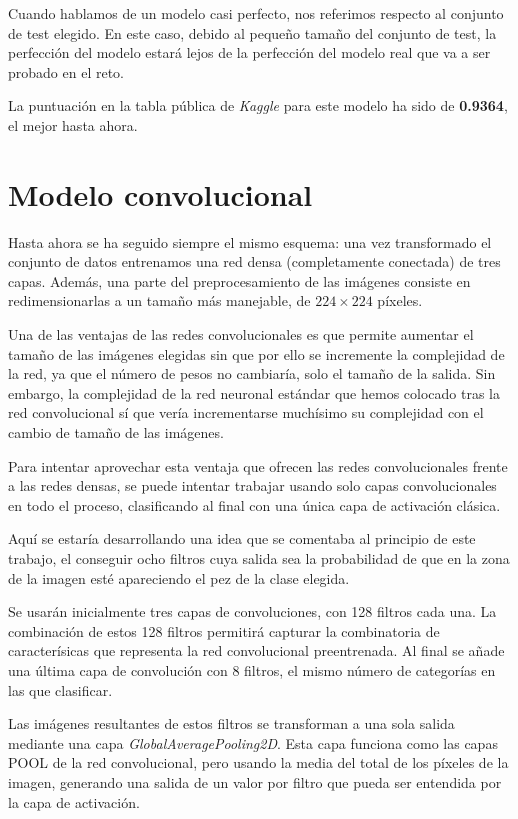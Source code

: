 Cuando hablamos de un modelo casi perfecto, nos referimos respecto al conjunto de test elegido. En este caso, debido al pequeño tamaño del conjunto de test, la perfección del modelo estará lejos de la perfección del modelo real que va a ser probado en el reto.

La puntuación en la tabla pública de \textit{Kaggle} para este modelo ha sido
de \textbf{0.9364}, el mejor hasta ahora.

\section{Modelo convolucional}

Hasta ahora se ha seguido siempre el mismo esquema: una vez transformado el
conjunto de datos entrenamos una red densa (completamente conectada) de tres
capas. Además, una parte del preprocesamiento de las imágenes consiste en
redimensionarlas a un tamaño más manejable, de $224\times224$ píxeles.

Una de las ventajas de las redes convolucionales es que permite aumentar el
tamaño de las imágenes elegidas sin que por ello se incremente la complejidad
de la red, ya que el número de pesos no cambiaría, solo el tamaño de la salida.
Sin embargo, la complejidad de la red neuronal estándar que hemos colocado tras
la red convolucional sí que vería incrementarse muchísimo su complejidad con el
cambio de tamaño de las imágenes.

Para intentar aprovechar esta ventaja que ofrecen las redes convolucionales
frente a las redes densas, se puede intentar trabajar usando solo capas
convolucionales en todo el proceso, clasificando al final con una única capa de
activación clásica.

Aquí se estaría desarrollando una idea que se comentaba al principio de este
trabajo, el conseguir ocho filtros cuya salida sea la probabilidad de que en la
zona de la imagen esté apareciendo el pez de la clase elegida.

Se usarán inicialmente tres capas de convoluciones, con 128 filtros cada una.
La combinación de estos 128 filtros permitirá capturar la combinatoria de
caracterísicas que representa la red convolucional preentrenada. Al final se
añade una última capa de convolución con 8 filtros, el mismo número de
categorías en las que clasificar.

Las imágenes resultantes de estos filtros se transforman a una sola salida
mediante una capa \textit{GlobalAveragePooling2D}. Esta capa funciona como las
capas POOL de la red convolucional, pero usando la media del total de los
píxeles de la imagen, generando una salida de un valor por filtro que pueda ser
entendida por la capa de activación.

